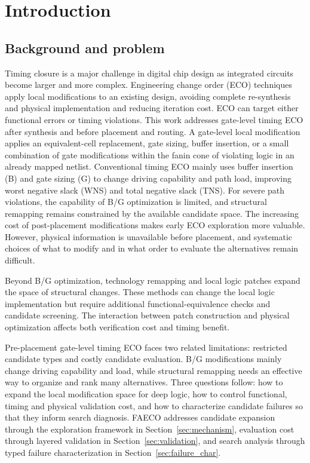 \documentclass[preprint,12pt]{elsarticle}
\begin{document}
\section{Introduction}
\subsection{Background and problem}
Timing closure is a major challenge in digital chip design as integrated circuits become larger and more complex. Engineering change order (ECO) techniques apply local modifications to an existing design, avoiding complete re-synthesis and physical implementation and reducing iteration cost. ECO can target either functional errors or timing violations. This work addresses gate-level timing ECO after synthesis and before placement and routing. A gate-level local modification applies an equivalent-cell replacement, gate sizing, buffer insertion, or a small combination of gate modifications within the fanin cone of violating logic in an already mapped netlist. Conventional timing ECO mainly uses buffer insertion (B) and gate sizing (G) to change driving capability and path load, improving worst negative slack (WNS) and total negative slack (TNS). For severe path violations, the capability of B/G optimization is limited, and structural remapping remains constrained by the available candidate space\cite{ho2010eco,liu2021rlsizer,chen2024aito}. The increasing cost of post-placement modifications makes early ECO exploration more valuable. However, physical information is unavailable before placement, and systematic choices of what to modify and in what order to evaluate the alternatives remain difficult.

Beyond B/G optimization, technology remapping and local logic patches expand the space of structural changes. These methods can change the local logic implementation but require additional functional-equivalence checks and candidate screening. The interaction between patch construction and physical optimization affects both verification cost and timing benefit.

Pre-placement gate-level timing ECO faces two related limitations: restricted candidate types and costly candidate evaluation. B/G modifications mainly change driving capability and load, while structural remapping needs an effective way to organize and rank many alternatives. Three questions follow: how to expand the local modification space for deep logic, how to control functional, timing and physical validation cost, and how to characterize candidate failures so that they inform search diagnosis. FAECO addresses candidate expansion through the exploration framework in Section~\ref{sec:mechanism}, evaluation cost through layered validation in Section~\ref{sec:validation}, and search analysis through typed failure characterization in Section~\ref{sec:failure_char}.
\end{document}
